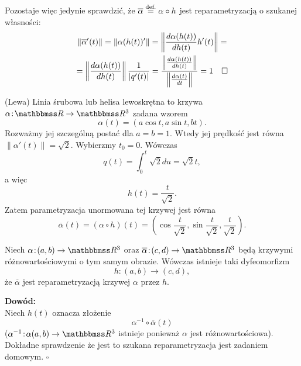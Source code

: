 \begin{frame}[<+->]
Pozostaje więc jedynie sprawdzić, że $\overline{\alpha}\define\alpha\circ h$ jest reparametryzacją o szukanej własności:
\pause\begin{multline*}
\|\overline{\alpha}'(t)\|=\le\|\alpha(h(t))'\ri\|=\le\|\frac{d\alpha(h(t))}{dh(t)}h'(t)\ri\|=\\=\le\|\frac{d\alpha(h(t))}{dh(t)}\ri\|\frac{1}{|q'(t)|}=\frac{\le\|\frac{d\alpha(h(t))}{dh(t)}\ri\|}{\le\|\frac{d\alpha(t)}{dt}\ri\|}=1\quad\square
\end{multline*}
\end{frame}
\begin{frame}[<+->]
\begin{przyklad}
(Lewa) Linia śrubowa lub helisa lewoskrętna to krzywa $\alpha\colon \R\to \R^3$ zadana wzorem
\[\alpha(t)=(a\cos{t},a\sin{t},bt).\]
Rozważmy jej szczególną postać dla $a=b=1$. Wtedy jej prędkość jest równa $\|\alpha'(t)\|=\sqrt{2}$. Wybierzmy $t_0=0$. Wówczas \[q(t)=\int_0^t\sqrt{2} du=\sqrt{2}t,\] a więc \[h(t)=\frac{t}{\sqrt{2}}.\] Zatem parametryzacja unormowana tej krzywej jest równa \[\overline{\alpha}(t)=(\alpha\circ h)(t)=\left(\cos{\frac{t}{\sqrt{2}}},\sin{\frac{t}{\sqrt{2}}},\frac{t}{\sqrt{2}}\right)\!.\]
\end{przyklad}

\end{frame}
\begin{frame}[<+->]

\begin{center}
\begin{tikzpicture}[y=0.80pt, x=0.8pt,scale=0.7,yscale=-1, inner sep=0pt, outer sep=0pt]

\end{tikzpicture}
\end{center}
\end{frame}
\begin{frame}

\begin{lemat}
Niech $\alpha\colon (a,b)\to \R^3$ oraz $\overline{\alpha}\colon (c,d)\to \R^3$ będą krzywymi różnowartościowymi o tym samym obrazie. Wówczas istnieje taki dyfeomorfizm \[h\colon (a,b)\to (c,d),\] że $\overline{\alpha}$ jest reparametryzacją krzywej $\alpha$ przez $h$.
\end{lemat}
\pause \textcolor{ared}{\textbf{Dowód:}}\\
Niech $h(t)$ oznacza złożenie \[\alpha^{-1}\circ \overline{\alpha} (t)\] ($\alpha^{-1}\colon \alpha(a,b)\to \R^3$ istnieje ponieważ $\alpha$ jest r\'ożnowartościowa). Dokładne sprawdzenie że jest to szukana reparametryzacja jest zadaniem domowym.
\hfill $\square$

\end{frame}
